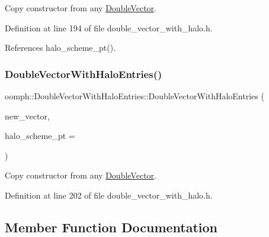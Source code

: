 Copy constructor from any \hyperlink{classoomph_1_1DoubleVector}{Double\+Vector}. 



Definition at line 194 of file double\+\_\+vector\+\_\+with\+\_\+halo.\+h.



References halo\+\_\+scheme\+\_\+pt().

\mbox{\label{classoomph_1_1DoubleVectorWithHaloEntries_a4af6e4f6038ea0071b7b19d4f4c1a859}} 
\subsubsection{\texorpdfstring{Double\+Vector\+With\+Halo\+Entries()}{DoubleVectorWithHaloEntries()}\hspace{0.1cm}{\footnotesize\ttfamily [5/5]}}
{\footnotesize\ttfamily oomph\+::\+Double\+Vector\+With\+Halo\+Entries\+::\+Double\+Vector\+With\+Halo\+Entries (\begin{DoxyParamCaption}\item[{const \hyperlink{classoomph_1_1DoubleVector}{Double\+Vector} \&}]{new\+\_\+vector,  }\item[{\hyperlink{classoomph_1_1DoubleVectorHaloScheme}{Double\+Vector\+Halo\+Scheme} $\ast$const \&}]{halo\+\_\+scheme\+\_\+pt = {} }\end{DoxyParamCaption})\hspace{0.3cm}{\ttfamily [inline]}}



Copy constructor from any \hyperlink{classoomph_1_1DoubleVector}{Double\+Vector}. 



Definition at line 202 of file double\+\_\+vector\+\_\+with\+\_\+halo.\+h.



\subsection{Member Function Documentation}
\mbox{\label{classoomph_1_1DoubleVectorWithHaloEntries_a1aab1a84c6a82a755fdc3c6b27ce49d7}} 
